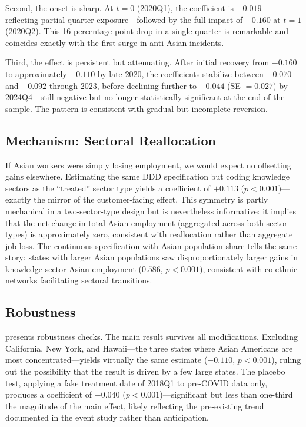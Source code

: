 \documentclass[12pt]{article}
\begin{document}
Second, the onset is sharp. At $t = 0$ (2020Q1), the coefficient is $-0.019$---reflecting partial-quarter exposure---followed by the full impact of $-0.160$ at $t = 1$ (2020Q2). This 16-percentage-point drop in a single quarter is remarkable and coincides exactly with the first surge in anti-Asian incidents.

Third, the effect is persistent but attenuating. After initial recovery from $-0.160$ to approximately $-0.110$ by late 2020, the coefficients stabilize between $-0.070$ and $-0.092$ through 2023, before declining further to $-0.044$ (SE $= 0.027$) by 2024Q4---still negative but no longer statistically significant at the end of the sample. The pattern is consistent with gradual but incomplete reversion.

\subsection{Mechanism: Sectoral Reallocation}

If Asian workers were simply losing employment, we would expect no offsetting gains elsewhere. Estimating the same DDD specification but coding knowledge sectors as the ``treated'' sector type yields a coefficient of $+0.113$ ($p < 0.001$)---exactly the mirror of the customer-facing effect. This symmetry is partly mechanical in a two-sector-type design but is nevertheless informative: it implies that the net change in total Asian employment (aggregated across both sector types) is approximately zero, consistent with reallocation rather than aggregate job loss. The continuous specification with Asian population share tells the same story: states with larger Asian populations saw disproportionately larger gains in knowledge-sector Asian employment ($0.586$, $p < 0.001$), consistent with co-ethnic networks facilitating sectoral transitions.

\subsection{Robustness}



 presents robustness checks. The main result survives all modifications. Excluding California, New York, and Hawaii---the three states where Asian Americans are most concentrated---yields virtually the same estimate ($-0.110$, $p < 0.001$), ruling out the possibility that the result is driven by a few large states. The placebo test, applying a fake treatment date of 2018Q1 to pre-COVID data only, produces a coefficient of $-0.040$ ($p < 0.001$)---significant but less than one-third the magnitude of the main effect, likely reflecting the pre-existing trend documented in the event study rather than anticipation.
\end{document}
